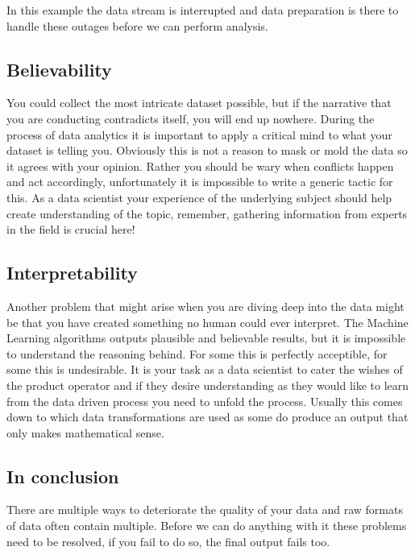 \documentclass[letterpaper,10pt,english]{jupyterBook}
\begin{document}
\sphinxAtStartPar
In this example the data stream is interrupted and data preparation is there to handle these outages before we can perform analysis.

\sphinxAtStartPar
{}


\subsection{Believability}
\label{\detokenize{c2_data_preparation/introduction:believability}}
\sphinxAtStartPar
You could collect the most intricate dataset possible, but if the narrative that you are conducting contradicts itself, you will end up nowhere.
During the process of data analytics it is important to apply a critical mind to what your dataset is telling you.
Obviously this is not a reason to mask or mold the data so it agrees with your opinion.
Rather you should be wary when conflicts happen and act accordingly, unfortunately it is impossible to write a generic tactic for this.
As a data scientist your experience of the underlying subject should help create understanding of the topic, remember, gathering information from experts in the field is crucial here!


\subsection{Interpretability}
\label{\detokenize{c2_data_preparation/introduction:interpretability}}
\sphinxAtStartPar
Another problem that might arise when you are diving deep into the data might be that you have created something no human could ever interpret.
The Machine Learning algorithms outputs plausible and believable results, but it is impossible to understand the reasoning behind.
For some this is perfectly acceptible, for some this is undesirable.
It is your task as a data scientist to cater the wishes of the product operator and if they desire understanding as they would like to learn from the data driven process you need to unfold the process.
Usually this comes down to which data transformations are used as some do produce an output that only makes mathematical sense.


\subsection{In conclusion}
\label{\detokenize{c2_data_preparation/introduction:in-conclusion}}
\sphinxAtStartPar
There are multiple ways to deteriorate the quality of your data and raw formats of data often contain multiple.
Before we can do anything with it these problems need to be resolved, if you fail to do so, the final output fails too.
\end{document}
